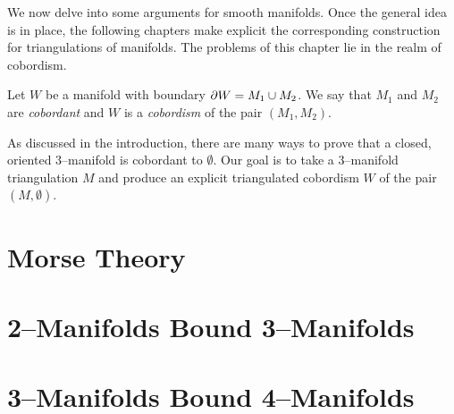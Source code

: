 We now delve into some arguments for smooth manifolds.
Once the general idea is in place, the following chapters make explicit the corresponding construction for triangulations of manifolds.
The problems of this chapter lie in the realm of cobordism.
\begin{defn}
  \label{def:cobordism}
  Let $W$ be a manifold with boundary $\partial W=M_1\cup M_2$.
  We say that $M_1$ and $M_2$ are \emph{cobordant} and $W$ is a \emph{cobordism} of the pair $(M_1,M_2)$.
\end{defn}
As discussed in the introduction, there are many ways to prove that a closed, oriented 3--manifold is cobordant to $\emptyset$.
Our goal is to take a 3--manifold triangulation $M$ and produce an explicit triangulated cobordism $W$ of the pair $(M,\emptyset)$.

\section{Morse Theory}


\section{2--Manifolds Bound 3--Manifolds}


\section{3--Manifolds Bound 4--Manifolds}


%
